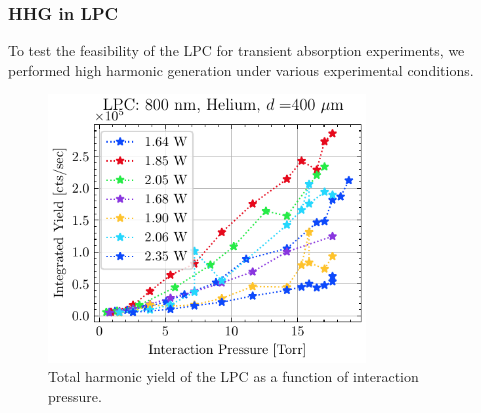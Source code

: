 




\subsubsection{HHG in LPC}

To test the feasibility of the LPC for transient absorption experiments, we performed high harmonic generation under various experimental conditions.

\begin{figure}
	\centering
	\includegraphics[width=0.75\textwidth]{figures/chap3/LPC_P_scaling_He800.pdf}
	\caption{Total harmonic yield of the LPC as a function of interaction pressure.}
	\label{fig:LPC_performance}
\end{figure}

